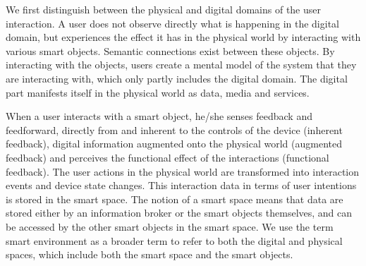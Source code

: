 We first distinguish between the physical and digital domains of the user interaction. A user does not observe directly what is happening in the digital domain, but experiences the effect it has in the physical world by interacting with various smart objects. Semantic connections exist between these objects. By interacting with the objects, users create a mental model of the system that they are interacting with, which only partly includes the digital domain. The digital part manifests itself in the physical world as data, media and services. 


When a user interacts with a smart object, he/she senses feedback and feedforward, directly from and inherent to the controls of the device (inherent feedback), digital information augmented onto the physical world (augmented feedback) and perceives the functional effect of the interactions (functional feedback). The user actions in the physical world are transformed into interaction events and device state changes. This interaction data in terms of user intentions is stored in the smart space. The notion of a smart space means that data are stored either by an information broker or the smart objects themselves, and can be accessed by the other smart objects in the smart space. We use the term smart environment as a broader term to refer to both the digital and physical spaces, which include both the smart space and the smart objects.







